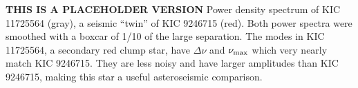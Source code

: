 \label{fig:twin}
\textbf{THIS IS A PLACEHOLDER VERSION} Power density spectrum of KIC 11725564 (gray), a seismic ``twin'' of KIC 9246715 (red). Both power spectra were smoothed with a boxcar of 1/10 of the large separation. The modes in KIC 11725564, a secondary red clump star, have $\Delta \nu$ and $\nu_{\rm{max}}$ which very nearly match KIC 9246715. They are less noisy and have larger amplitudes than KIC 9246715, making this star a useful asteroseismic comparison.
